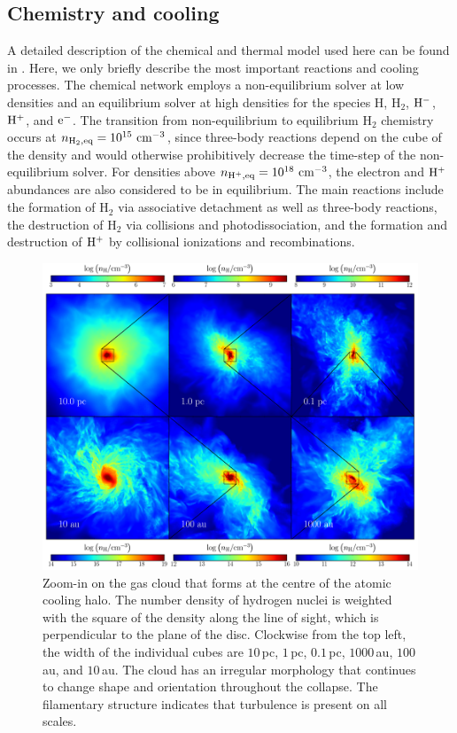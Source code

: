 \documentclass[useAMS,usenatbib]{mnras}
\newcommand{\cmmm}{\text{cm}^{-3}}
\newcommand{\HH}{\text{H}_2}          %
\newcommand{\HM}{{\rm H}^{-}}     %
\newcommand{\HP}{{\rm H}^{+}}     %
\newcommand{\e}{{\rm e}^{-}}     %
\begin{document}
\subsection{Chemistry and cooling}
\label{subsec:chemistry}

A detailed description of the chemical and thermal model used here can be found in \citet{Greif_2014}. Here, we only briefly describe the most important reactions and cooling processes. The chemical network employs a non-equilibrium solver at low densities and an equilibrium solver at high densities for the species H, $\HH$, $\HM$, $\HP$, and $\e$. The transition from non-equilibrium to equilibrium H$_2$ chemistry occurs at $n_{\rm H_2, eq} = 10^{15}~\cmmm$, since three-body reactions depend on the cube of the density and would otherwise prohibitively decrease the time-step of the non-equilibrium solver. For densities above $n_{\rm H^+, eq} = 10^{18}~\cmmm$, the electron and $\HP$ abundances are also considered to be in equilibrium. The main reactions include the formation of $\HH$ via associative detachment as well as three-body reactions, the destruction of $\HH$ via collisions and photodissociation, and the formation and destruction of $\HP$ by collisional ionizations and recombinations.

\begin{figure}
\begin{center}
\includegraphics[scale=0.68]{./f1.png}
\caption{Zoom-in on the gas cloud that forms at the centre of the atomic cooling halo. The number density of hydrogen nuclei is weighted with the square of the density along the line of sight, which is perpendicular to the plane of the disc. Clockwise from the top left, the width of the individual cubes are $10\,$pc, $1\,$pc, $0.1\,$pc, $1000\,$au, $100\,$au, and $10\,$au. The cloud has an irregular morphology that continues to change shape and orientation throughout the collapse. The filamentary structure indicates that turbulence is present on all scales.}
\label{fig:collapse}
\end{center}
\end{figure}
\end{document}
